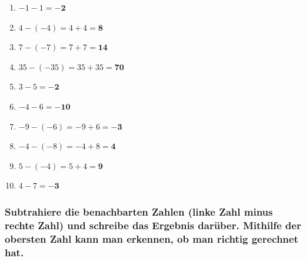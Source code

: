 \documentclass[a4paper,12pt]{article} %
\begin{document}
\begin{enumerate}
  \item \(-1 - 1 = \mathbf{-2}\) %

  \item \(4 - (-4) = 4 + 4 = \mathbf{8}\) %

  \item \(7 - (-7) = 7 + 7 = \mathbf{14}\) %

  \item \(35 - (-35) = 35 + 35 = \mathbf{70}\) %

  \item \(3 - 5 = \mathbf{-2}\) %

  \item \(-4 - 6 = \mathbf{-10}\) %

  \item \(-9 - (-6) = -9 + 6 = \mathbf{-3}\) %

  \item \(-4 - (-8) = -4 + 8 = \mathbf{4}\) %

  \item \(5 - (-4) = 5 + 4 = \mathbf{9}\) %

  \item \(4 - 7 = \mathbf{-3}\) %

\end{enumerate}

\subsubsection{Subtrahiere die benachbarten Zahlen (linke Zahl minus rechte Zahl)
und schreibe das Ergebnis darüber. Mithilfe der obersten Zahl kann man erkennen,
ob man richtig gerechnet hat.} %
\end{document}
